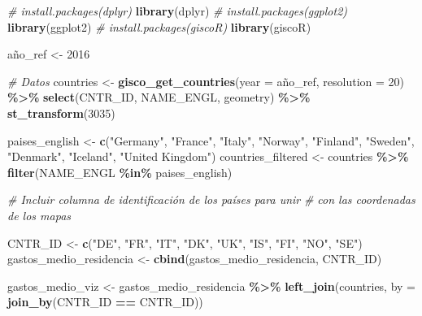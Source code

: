 \documentclass[data,article,submit,moreauthors,pdftex]{Definitions/mdpi}
\newenvironment{Shaded}{\begin{snugshade}}{\end{snugshade}}
\newcommand{\AttributeTok}[1]{\textcolor[rgb]{0.13,0.29,0.53}{#1}}
\newcommand{\CommentTok}[1]{\textcolor[rgb]{0.56,0.35,0.01}{\textit{#1}}}
\newcommand{\DecValTok}[1]{\textcolor[rgb]{0.00,0.00,0.81}{#1}}
\newcommand{\FunctionTok}[1]{\textcolor[rgb]{0.13,0.29,0.53}{\textbf{#1}}}
\newcommand{\NormalTok}[1]{#1}
\newcommand{\OtherTok}[1]{\textcolor[rgb]{0.56,0.35,0.01}{#1}}
\newcommand{\SpecialCharTok}[1]{\textcolor[rgb]{0.81,0.36,0.00}{\textbf{#1}}}
\newcommand{\StringTok}[1]{\textcolor[rgb]{0.31,0.60,0.02}{#1}}
\begin{document}
\begin{Shaded}
\begin{Highlighting}[]
\CommentTok{\# install.packages(\textquotesingle{}dplyr\textquotesingle{})}
\FunctionTok{library}\NormalTok{(dplyr)}
\CommentTok{\# install.packages(\textquotesingle{}ggplot2\textquotesingle{})}
\FunctionTok{library}\NormalTok{(ggplot2)}
\CommentTok{\# install.packages(\textquotesingle{}giscoR\textquotesingle{})}
\FunctionTok{library}\NormalTok{(giscoR)}

\NormalTok{año\_ref }\OtherTok{\textless{}{-}} \DecValTok{2016}

\CommentTok{\# Datos}
\NormalTok{countries }\OtherTok{\textless{}{-}} \FunctionTok{gisco\_get\_countries}\NormalTok{(}\AttributeTok{year =}\NormalTok{ año\_ref, }\AttributeTok{resolution =} \DecValTok{20}\NormalTok{) }\SpecialCharTok{\%\textgreater{}\%}
    \FunctionTok{select}\NormalTok{(CNTR\_ID, NAME\_ENGL, geometry) }\SpecialCharTok{\%\textgreater{}\%}
    \FunctionTok{st\_transform}\NormalTok{(}\DecValTok{3035}\NormalTok{)}

\NormalTok{paises\_english }\OtherTok{\textless{}{-}} \FunctionTok{c}\NormalTok{(}\StringTok{"Germany"}\NormalTok{, }\StringTok{"France"}\NormalTok{, }\StringTok{"Italy"}\NormalTok{, }\StringTok{"Norway"}\NormalTok{, }\StringTok{"Finland"}\NormalTok{,}
    \StringTok{"Sweden"}\NormalTok{, }\StringTok{"Denmark"}\NormalTok{, }\StringTok{"Iceland"}\NormalTok{, }\StringTok{"United Kingdom"}\NormalTok{)}
\NormalTok{countries\_filtered }\OtherTok{\textless{}{-}}\NormalTok{ countries }\SpecialCharTok{\%\textgreater{}\%}
    \FunctionTok{filter}\NormalTok{(NAME\_ENGL }\SpecialCharTok{\%in\%}\NormalTok{ paises\_english)}

\CommentTok{\# Incluir columna de identificación de los países para unir}
\CommentTok{\# con las coordenadas de los mapas}

\NormalTok{CNTR\_ID }\OtherTok{\textless{}{-}} \FunctionTok{c}\NormalTok{(}\StringTok{"DE"}\NormalTok{, }\StringTok{"FR"}\NormalTok{, }\StringTok{"IT"}\NormalTok{, }\StringTok{"DK"}\NormalTok{, }\StringTok{"UK"}\NormalTok{, }\StringTok{"IS"}\NormalTok{, }\StringTok{"FI"}\NormalTok{, }\StringTok{"NO"}\NormalTok{,}
    \StringTok{"SE"}\NormalTok{)}
\NormalTok{gastos\_medio\_residencia }\OtherTok{\textless{}{-}} \FunctionTok{cbind}\NormalTok{(gastos\_medio\_residencia, CNTR\_ID)}


\NormalTok{gastos\_medio\_viz }\OtherTok{\textless{}{-}}\NormalTok{ gastos\_medio\_residencia }\SpecialCharTok{\%\textgreater{}\%}
    \FunctionTok{left\_join}\NormalTok{(countries, }\AttributeTok{by =} \FunctionTok{join\_by}\NormalTok{(CNTR\_ID }\SpecialCharTok{==}\NormalTok{ CNTR\_ID))}




\end{Highlighting}
\end{Shaded}
\end{document}
